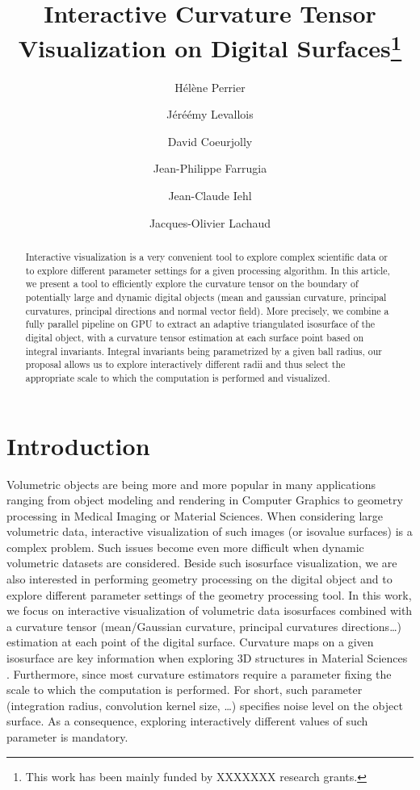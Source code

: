 \documentclass{llncs}
\title{Interactive Curvature Tensor Visualization on Digital
Surfaces\thanks{This work has been mainly funded by XXXXXXX research grants.}}
\author{H\'el\`ene Perrier\inst{1}\and J\'eré\'emy Levallois\inst{1,2}\and David
Coeurjolly\inst{1}\and Jean-Philippe Farrugia\inst{1}\and Jean-Claude
Iehl\inst{1}\and Jacques-Olivier Lachaud\inst{2} }
\institute{ Universit\'e de Lyon, CNRS\\
   LIRIS, UMR5205, F-69621, France
   \and
Universit\'e de Savoie, CNRS\\
LAMA, UMR5127, F-73776, France\\
}
\begin{document}
\maketitle


\begin{abstract}\sloppy
  Interactive visualization is a very convenient tool to explore
  complex scientific data or to explore different parameter settings
  for a given processing algorithm. In this article, we present a tool
  to efficiently explore the curvature tensor on the boundary of
  potentially large and dynamic digital objects (mean and gaussian curvature,
  principal curvatures, principal directions and normal vector
  field). More precisely, we combine a fully parallel pipeline on GPU
  to extract an adaptive triangulated isosurface of the digital
  object, with a curvature tensor estimation at each surface point
  based on integral invariants. Integral invariants being parametrized
  by a given ball radius, our proposal allows us to explore
  interactively different radii and thus select the appropriate scale
  to which the computation is performed and visualized.


\end{abstract}

\section{Introduction}
\label{sec:introduction}

Volumetric objects are being more and more popular in many
applications ranging from object modeling and rendering in Computer
Graphics to geometry processing in Medical Imaging or Material
Sciences. When considering large volumetric data, interactive
visualization of such images (or isovalue surfaces) is a complex
problem. Such issues become even more difficult when dynamic
volumetric datasets are considered. Beside such isosurface
visualization, we are also interested in performing geometry
processing on the digital object and to explore different parameter
settings of the geometry processing tool.  In this work, we focus on
interactive visualization of volumetric data isosurfaces combined with
a curvature tensor (mean/Gaussian curvature, principal curvatures
directions\ldots) estimation at each point of the digital
surface. Curvature maps on a given isosurface are key information when
exploring 3D structures in Material Sciences . Furthermore,
since most curvature estimators require a parameter fixing the scale
to which the computation is performed. For short, such parameter
(integration radius, convolution kernel size, \ldots) specifies noise
level on the object surface. As a consequence, exploring interactively
different values of such parameter is mandatory.
\vspace{0.2cm}
\end{document}
